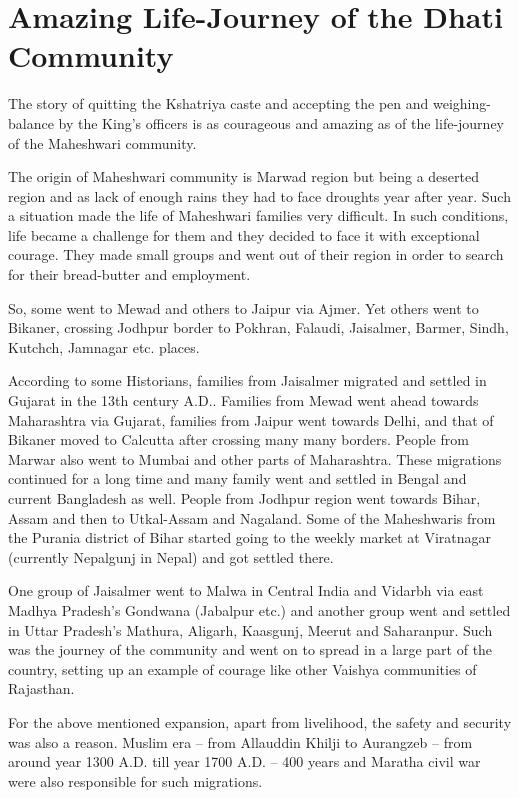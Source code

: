\chapter{Amazing Life-Journey of the Dhati Community}
The story of quitting the Kshatriya caste and accepting the pen and weighing-balance by the King's officers is as courageous and amazing as of the life-journey of the Maheshwari community.

The origin of Maheshwari community is Marwad region but being a deserted region and as lack of enough rains they had to face droughts year after year. Such a situation made the life of Maheshwari families very difficult. In such conditions, life became a challenge for them and they decided to face it with exceptional courage. They made small groups and went out of their region in order to search for their bread-butter and employment.

So, some went to Mewad and others to Jaipur via Ajmer. Yet others went to Bikaner, crossing Jodhpur border to Pokhran, Falaudi, Jaisalmer, Barmer, Sindh, Kutchch, Jamnagar etc. places.

According to some Historians, families from Jaisalmer migrated and settled in Gujarat in the 13th century A.D.. Families from Mewad went ahead towards Maharashtra via Gujarat, families from Jaipur went towards Delhi, and that of Bikaner moved to Calcutta after crossing many many borders. People from Marwar also went to Mumbai and other parts of Maharashtra. These migrations continued for a long time and many family went and settled in Bengal and current Bangladesh as well. People from Jodhpur region went towards Bihar, Assam and then to Utkal-Assam and Nagaland. Some of the Maheshwaris from the Purania district of Bihar started going to the weekly market at Viratnagar (currently Nepalgunj in Nepal) and got settled there.

One group of Jaisalmer went to Malwa in Central India and Vidarbh via east Madhya Pradesh's Gondwana (Jabalpur etc.) and another group went and settled in Uttar Pradesh's Mathura, Aligarh, Kaasgunj, Meerut and Saharanpur. Such was the journey of the community and went on to spread in a large part of the country, setting up an example of courage like other Vaishya communities of Rajasthan.

For the above mentioned expansion, apart from livelihood, the safety and security was also a reason. Muslim era -- from Allauddin Khilji to Aurangzeb -- from around year 1300 A.D. till year 1700 A.D. -- 400 years and Maratha civil war were also responsible for such migrations.

